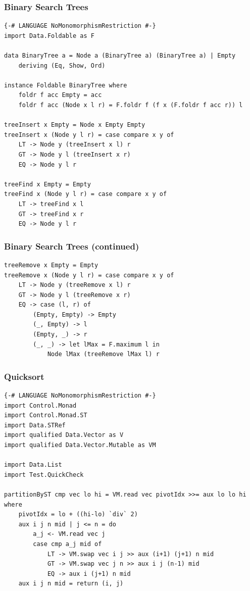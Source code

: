 \documentclass{beamer}
\begin{document}
\begin{frame}[fragile]
\frametitle{Binary Search Trees}
\begin{Verbatim}[frame=single, fontsize=\scriptsize]
{-# LANGUAGE NoMonomorphismRestriction #-}
import Data.Foldable as F

data BinaryTree a = Node a (BinaryTree a) (BinaryTree a) | Empty
    deriving (Eq, Show, Ord)

instance Foldable BinaryTree where
    foldr f acc Empty = acc
    foldr f acc (Node x l r) = F.foldr f (f x (F.foldr f acc r)) l

treeInsert x Empty = Node x Empty Empty
treeInsert x (Node y l r) = case compare x y of
    LT -> Node y (treeInsert x l) r
    GT -> Node y l (treeInsert x r)
    EQ -> Node y l r

treeFind x Empty = Empty
treeFind x (Node y l r) = case compare x y of
    LT -> treeFind x l
    GT -> treeFind x r
    EQ -> Node y l r
\end{Verbatim}
\end{frame}

\begin{frame}[fragile]
\frametitle{Binary Search Trees (continued)}
\begin{Verbatim}[frame=single, fontsize=\scriptsize]
treeRemove x Empty = Empty
treeRemove x (Node y l r) = case compare x y of
    LT -> Node y (treeRemove x l) r
    GT -> Node y l (treeRemove x r)
    EQ -> case (l, r) of
        (Empty, Empty) -> Empty
        (_, Empty) -> l
        (Empty, _) -> r
        (_, _) -> let lMax = F.maximum l in
            Node lMax (treeRemove lMax l) r 
\end{Verbatim}
\end{frame}

\begin{frame}[fragile]
\frametitle{Quicksort}
\begin{Verbatim}[frame=single, fontsize=\scriptsize]
{-# LANGUAGE NoMonomorphismRestriction #-}
import Control.Monad
import Control.Monad.ST
import Data.STRef
import qualified Data.Vector as V
import qualified Data.Vector.Mutable as VM

import Data.List
import Test.QuickCheck

partitionByST cmp vec lo hi = VM.read vec pivotIdx >>= aux lo lo hi where
    pivotIdx = lo + ((hi-lo) `div` 2)
    aux i j n mid | j <= n = do
        a_j <- VM.read vec j
        case cmp a_j mid of
            LT -> VM.swap vec i j >> aux (i+1) (j+1) n mid
            GT -> VM.swap vec j n >> aux i j (n-1) mid
            EQ -> aux i (j+1) n mid
    aux i j n mid = return (i, j)
\end{Verbatim}
\end{frame}
\end{document}
